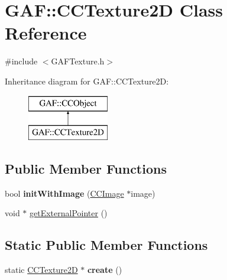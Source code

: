 \hypertarget{class_g_a_f_1_1_c_c_texture2_d}{\section{G\-A\-F\-:\-:C\-C\-Texture2\-D Class Reference}
\label{class_g_a_f_1_1_c_c_texture2_d}
}


{\ttfamily \#include $<$G\-A\-F\-Texture.\-h$>$}

Inheritance diagram for G\-A\-F\-:\-:C\-C\-Texture2\-D\-:\begin{figure}[H]
\begin{center}
\leavevmode
\includegraphics[height=2.000000cm]{class_g_a_f_1_1_c_c_texture2_d}
\end{center}
\end{figure}
\subsection*{Public Member Functions}
\begin{DoxyCompactItemize}
\item 
\hypertarget{class_g_a_f_1_1_c_c_texture2_d_af3b2b7faeb932e796ffd249041843236}{bool {\bfseries init\-With\-Image} (\hyperlink{class_g_a_f_1_1_c_c_image}{C\-C\-Image} $\ast$image)}\label{class_g_a_f_1_1_c_c_texture2_d_af3b2b7faeb932e796ffd249041843236}

\item 
void $\ast$ \hyperlink{class_g_a_f_1_1_c_c_texture2_d_ac0ae70bb23eacafb6947028779fbc456}{get\-External\-Pointer} ()
\end{DoxyCompactItemize}
\subsection*{Static Public Member Functions}
\begin{DoxyCompactItemize}
\item 
\hypertarget{class_g_a_f_1_1_c_c_texture2_d_a0a962928653419eb50f7f004af35bdd8}{static \hyperlink{class_g_a_f_1_1_c_c_texture2_d}{C\-C\-Texture2\-D} $\ast$ {\bfseries create} ()}\label{class_g_a_f_1_1_c_c_texture2_d_a0a962928653419eb50f7f004af35bdd8}

\end{DoxyCompactItemize}


